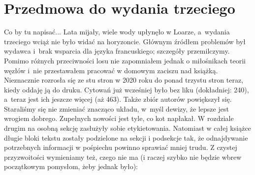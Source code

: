 \section*{Przedmowa do wydania trzeciego}
Co by tu napisać...
Lata mijały, wiele wody upłynęło w Loarze, a~wydania trzeciego wciąż nie było widać na horyzoncie.
Głównym źródłem problemów był wydawca i~brak wsparcia dla języka francuskiego; szczegóły przemilczymy.
Pomimo różnych przeciwności losu nie zapomniałem jednak o miłośnikach teorii węzłów i~nie przestawałem pracować w domowym zaciszu nad książką.
Nieznacznie rozrosła się ze stu stron w 2020 roku do ponad trzystu stron teraz, kiedy oddaję ją do druku.
Cytowań już wcześniej było bez liku (dokładniej: 240), a~teraz jest ich jeszcze więcej (aż 463).
Także zbiór autorów powiększył się.
Staraliśmy się nie zmieniać znacząco układu, w~myśl dewizy, że lepsze jest wrogiem dobrego.
Zupełnych nowości jest tyle, co kot napłakał.
W rozdziale drugim na osobną sekcję zasłużyły sobie etykietowania.
Natomiast w całej książce długie bloki tekstu zostały podzielone na sekcji i podsekcje tak, że odnajdywanie potrzebnych informacji w pośpiechu powinno sprawiać mniej trudu.
Z czystej przyzwoitości wymieniamy też, czego nie ma (i raczej szybko nie będzie wbrew początkowym pomysłom, żeby jednak było):
